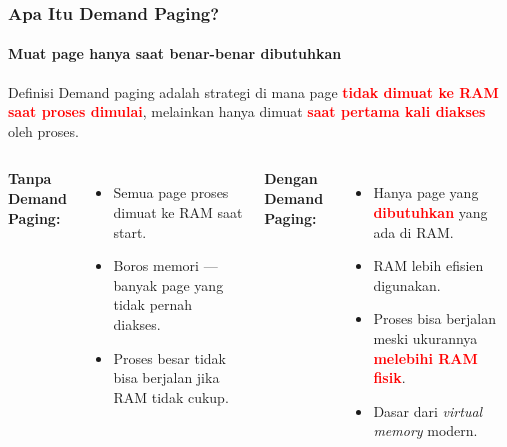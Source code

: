 \documentclass[t,aspectratio=169,xcolor=dvipsnames]{beamer}
\newcommand{\tem}[1]{\textbf{\textcolor{red}{#1}}}
\begin{document}
\begin{frame}
    \frametitle{Apa Itu Demand Paging?}
    \framesubtitle{Muat page hanya saat benar-benar dibutuhkan}
    \small

    \begin{block}{Definisi}
        Demand paging adalah strategi di mana page \tem{tidak dimuat ke RAM saat proses dimulai},
        melainkan hanya dimuat \tem{saat pertama kali diakses} oleh proses.
    \end{block}

    \vspace{0.2cm}
    \begin{columns}[T]
        \textbf{Tanpa Demand Paging:}
        \begin{itemize}
            \item Semua page proses dimuat ke RAM saat start.
            \item Boros memori — banyak page yang tidak pernah diakses.
            \item Proses besar tidak bisa berjalan jika RAM tidak cukup.
        \end{itemize}

        \textbf{Dengan Demand Paging:}
        \begin{itemize}
            \item Hanya page yang \tem{dibutuhkan} yang ada di RAM.
            \item RAM lebih efisien digunakan.
            \item Proses bisa berjalan meski ukurannya \tem{melebihi RAM fisik}.
            \item Dasar dari \textit{virtual memory} modern.
        \end{itemize}
    \end{columns}
\end{frame}
\end{document}
